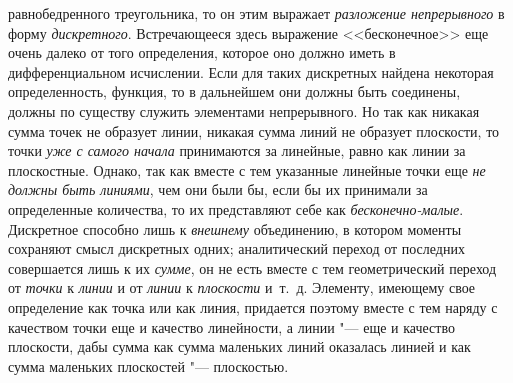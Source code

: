 равнобедренного треугольника, то он этим выражает
{\em разложение непрерывного} в форму
{\em дискретного}. Встречающееся здесь выражение
<<бесконечное>> еще очень далеко от того определения, которое оно должно
иметь в дифференциальном исчислении. Если для таких дискретных найдена
некоторая определенность, функция, то в дальнейшем они должны быть
соединены, должны по существу служить элементами непрерывного. Но так как
никакая сумма точек не образует линии, никакая сумма линий не образует
плоскости, то точки {\em уже с самого начала}
принимаются за линейные, равно как линии за плоскостные. Однако, так как
вместе с тем указанные линейные точки еще {\em не
должны быть линиями}, чем они были бы, если бы их принимали за определенные
количества, то их представляют себе как
{\em бесконечно-малые}. Дискретное способно лишь к
{\em внешнему} объединению, в котором моменты сохраняют
смысл дискретных одних; аналитический переход от последних совершается лишь
к их {\em сумме}, он не есть вместе с тем
геометрический переход от {\em точки} к
{\em линии} и от {\em линии} к
{\em плоскости} и~т.~д. Элементу, имеющему свое
определение как точка или как линия, придается поэтому вместе с тем наряду
с качеством точки еще и качество линейности, а линии "--- еще и качество
плоскости, дабы сумма как сумма маленьких линий оказалась линией и как
сумма маленьких плоскостей "--- плоскостью.

